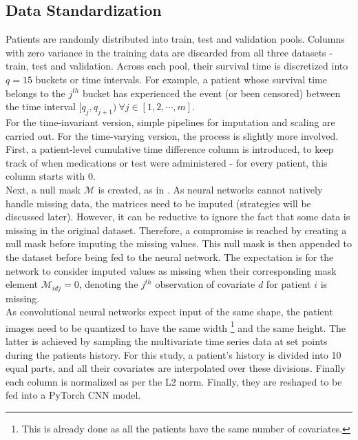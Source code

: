 \documentclass[%
 reprint,
 amsmath,amssymb,
 aps,nofootinbib
]{revtex4-2}
\begin{document}
\subsection{\label{censoring}Data Standardization}
Patients are randomly distributed into train, test and validation pools. Columns with zero variance in the training data are discarded from all three datasets - train, test and validation. Across each pool, their survival time is discretized into $q=15$ buckets or time intervals. For example, a patient whose survival time belongs to the $j^{th}$ bucket has experienced the event (or been censored) between the time interval $[q_j, q_{j+1})\ \forall j \in [1,2,\cdots,m]$.\\

For the time-invariant version, simple pipelines for imputation and scaling are carried out. For the time-varying version, the process is slightly more involved. First, a patient-level cumulative time difference column is introduced, to keep track of when medications or test were administered - for every patient, this column starts with 0. \\

Next, a null mask $\mathcal{M}$ is created, as in \cite{deephit}. As neural networks cannot natively handle missing data, the matrices need to be imputed (strategies will be discussed later). However, it can be reductive to ignore the fact that some data is missing in the original dataset. Therefore, a compromise is reached by creating a null mask before imputing the missing values. This null mask is then appended to the dataset before being fed to the neural network. The expectation is for the network to consider imputed values as missing when their corresponding mask element $\mathcal{M}_{idj}=0$, denoting the $j^{th}$ observation of covariate $d$ for patient $i$ is missing.\\

As convolutional neural networks expect input of the same shape, the patient images need to be quantized to have the same width \footnote{This is already done as all the patients have the same number of covariates.} and the same height. The latter is achieved by sampling the multivariate time series data at set points during the patients history. For this study, a patient's history is divided into 10 equal parts, and all their covariates are interpolated over these divisions. Finally each column is normalized as per the L2 norm. Finally, they are reshaped to be fed into a PyTorch CNN model.
\end{document}
